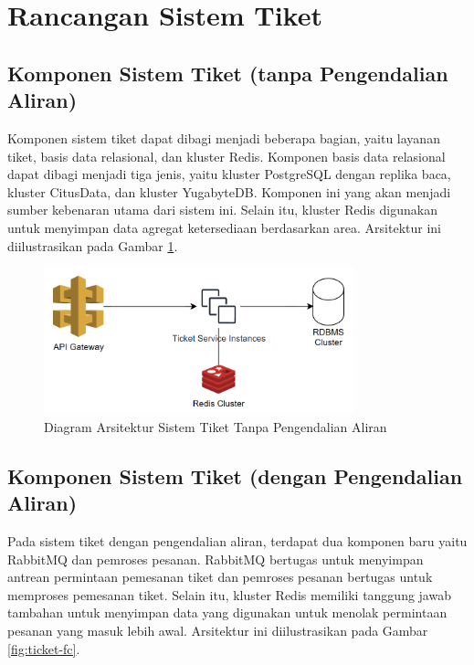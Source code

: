 \section{Rancangan Sistem Tiket}

\subsection{Komponen Sistem Tiket (tanpa Pengendalian Aliran)}

Komponen sistem tiket dapat dibagi menjadi beberapa bagian, yaitu layanan tiket, basis data relasional, dan kluster Redis. Komponen basis data relasional dapat dibagi menjadi tiga jenis, yaitu kluster PostgreSQL dengan replika baca, kluster CitusData, dan kluster YugabyteDB. Komponen ini yang akan menjadi sumber kebenaran utama dari sistem ini. Selain itu, kluster Redis digunakan untuk menyimpan data agregat ketersediaan berdasarkan area. Arsitektur ini diilustrasikan pada Gambar \ref{fig:ticket-nofc}.

\begin{figure}[H]
    \centering
    \includegraphics[width=0.8\textwidth]{resources/chapter-3/ticket-nofc.png}
    \caption{Diagram Arsitektur Sistem Tiket Tanpa Pengendalian Aliran}
    \label{fig:ticket-nofc}
\end{figure}

\pagebreak

\subsection{Komponen Sistem Tiket (dengan Pengendalian Aliran)}

Pada sistem tiket dengan pengendalian aliran, terdapat dua komponen baru yaitu RabbitMQ dan pemroses pesanan. RabbitMQ bertugas untuk menyimpan antrean permintaan pemesanan tiket dan pemroses pesanan bertugas untuk memproses pemesanan tiket. Selain itu, kluster Redis memiliki tanggung jawab tambahan untuk menyimpan data yang digunakan untuk menolak permintaan pesanan yang masuk lebih awal. Arsitektur ini diilustrasikan pada Gambar \ref{fig:ticket-fc}.

